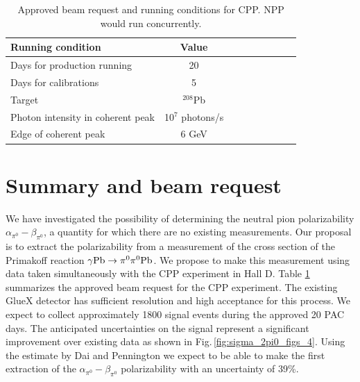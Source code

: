 \begin{table}[hbt]
\caption{Approved beam request and running conditions for CPP. NPP would run concurrently.
\label{request}
}
\begin{center}
\begin{tabular}{|l|c|c|c|c|c|c|c|c|}
\hline
\hline
  {\bf Running condition}  & {\bf Value}           \\ \hline
  Days for production running  &   20   \\ \hline
  Days for calibrations &  5       \\ \hline
  Target   & $^{208}$Pb   \\ \hline
  Photon intensity in coherent peak &   10$^7$ photons/s     \\ \hline
  Edge of coherent peak  &  6 GeV   \\ \hline
 \hline
 \hline
\end{tabular}
\end{center}
\end{table}
 
\section{Summary and beam request}
We have investigated the possibility of determining the neutral pion
polarizability $\alpha_{\pi^0}-\beta_{\pi^0}$, a quantity for which there are no existing measurements.
Our proposal is to extract the polarizability from a 
measurement of the cross section of the Primakoff reaction $\gamma
\rm{Pb}\rightarrow \pi^0 \pi^0 \rm{Pb}$. We propose to make this
measurement using data taken simultaneously with the CPP\cite{CPPexp}
experiment in Hall D. Table \ref{request} summarizes the approved beam request for the CPP experiment.
The existing GlueX detector has sufficient
resolution and high acceptance for this process. We expect to collect approximately 1800 signal events during the
approved 20 PAC days. The anticipated   uncertainties on
the signal represent a significant improvement over existing data as shown in Fig.\,\ref{fig:sigma_2pi0_figs_4}.
Using the estimate by Dai and Pennington \cite{Dai:2016ytz} we expect to be able to make the first extraction of the 
$\alpha_{\pi^0}-\beta_{\pi^0}$ polarizability with an uncertainty of 39\%.

